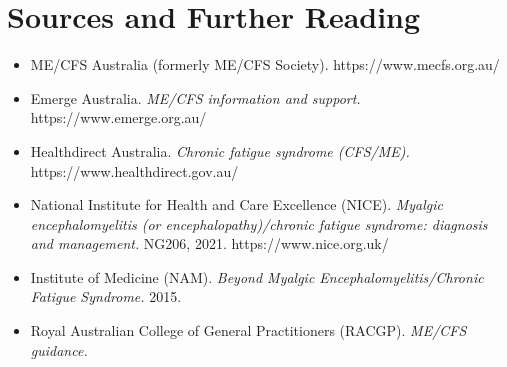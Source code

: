 \section*{Sources and Further Reading}
\begin{itemize}
    \item ME/CFS Australia (formerly ME/CFS Society). https://www.mecfs.org.au/
    \item Emerge Australia. \textit{ME/CFS information and support.} https://www.emerge.org.au/
    \item Healthdirect Australia. \textit{Chronic fatigue syndrome (CFS/ME).} https://www.healthdirect.gov.au/
    \item National Institute for Health and Care Excellence (NICE). \textit{Myalgic encephalomyelitis (or encephalopathy)/chronic fatigue syndrome: diagnosis and management.} NG206, 2021. https://www.nice.org.uk/
    \item Institute of Medicine (NAM). \textit{Beyond Myalgic Encephalomyelitis/Chronic Fatigue Syndrome.} 2015.
    \item Royal Australian College of General Practitioners (RACGP). \textit{ME/CFS guidance.}
\end{itemize}

\clearpage
